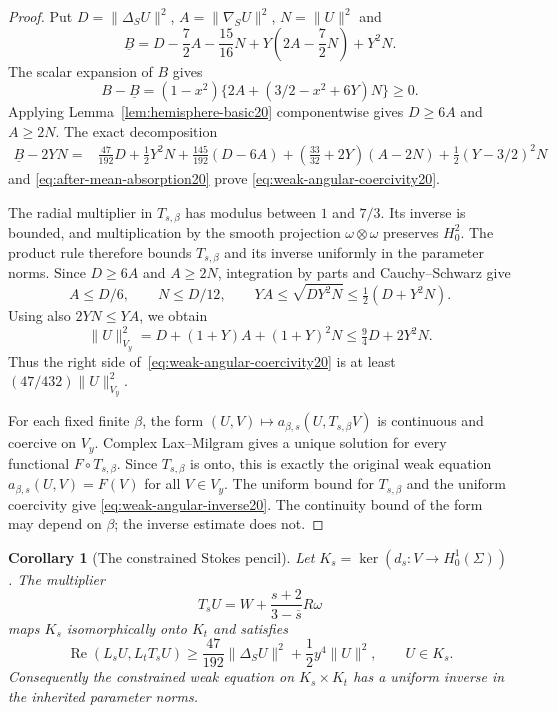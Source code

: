 \documentclass[11pt,a4paper]{article}
\newtheorem{corollary}[theorem]{Corollary}
\theoremstyle{remark}
\numberwithin{equation}{section}
\begin{document}
\begin{proof}
Put $D=\|\Delta_SU\|^2$, $A=\|\nabla_SU\|^2$, $N=\|U\|^2$ and
\[
 \underline B=D-\frac72A-\frac{15}{16}N
   +Y\left(2A-\frac72N\right)+Y^2N.
\]
The scalar expansion of $B$ gives
\[
 B-\underline B=(1-x^2)\{2A+(3/2-x^2+6Y)N\}\ge0.
\]
Applying Lemma~\ref{lem:hemisphere-basic20} componentwise gives
$D\ge6A$ and $A\ge2N$. The exact decomposition
\begin{align*}
 \underline B-2YN={}&\frac{47}{192}D+\frac12Y^2N
 +\frac{145}{192}(D-6A)
 +\left(\frac{33}{32}+2Y\right)(A-2N)
 +\frac12(Y-3/2)^2N
\end{align*}
and \eqref{eq:after-mean-absorption20} prove
\eqref{eq:weak-angular-coercivity20}.

The radial multiplier in $T_{s,\beta}$ has modulus between $1$ and
$7/3$. Its inverse is bounded, and multiplication by the smooth projection
$\omega\otimes\omega$ preserves $H_0^2$. The product rule therefore bounds
$T_{s,\beta}$ and its inverse uniformly in the parameter norms.
Since $D\ge6A$ and $A\ge2N$, integration by parts and Cauchy--Schwarz give
\[
 A\le D/6,\qquad N\le D/12,\qquad
 YA\le\sqrt{DY^2N}\le\tfrac12(D+Y^2N).
\]
Using also $2YN\le YA$, we obtain
\[
 \|U\|_{V_y}^2=D+(1+Y)A+(1+Y)^2N
 \le\tfrac94D+2Y^2N.
\]
Thus the right side of~\eqref{eq:weak-angular-coercivity20} is at least
$(47/432)\|U\|_{V_y}^2$.

For each fixed finite $\beta$, the form
$(U,V)\mapsto a_{\beta,s}(U,T_{s,\beta}V)$ is continuous and coercive on
$V_y$. Complex Lax--Milgram gives a unique solution for every functional
$F\circ T_{s,\beta}$. Since $T_{s,\beta}$ is onto, this is exactly the
original weak equation $a_{\beta,s}(U,V)=F(V)$ for all $V\in V_y$.
The uniform bound for $T_{s,\beta}$ and the uniform coercivity give
\eqref{eq:weak-angular-inverse20}. The continuity bound of the form may
depend on $\beta$; the inverse estimate does not.
\end{proof}

\begin{corollary}[The constrained Stokes pencil]\label{cor:stokes-kernel20}
Let $K_s=\ker(d_s:V\to H_0^1(\Sigma))$. The multiplier
\[
 T_sU=W+\frac{s+2}{3-\overline s}R\omega
\]
maps $K_s$ isomorphically onto $K_t$ and satisfies
\[
 \operatorname{Re}(L_sU,L_tT_sU)
 \ge\frac{47}{192}\|\Delta_SU\|^2+\frac12y^4\|U\|^2,
 \qquad U\in K_s.
\]
Consequently the constrained weak equation on $K_s\times K_t$ has a
uniform inverse in the inherited parameter norms.
\end{corollary}
\end{document}
